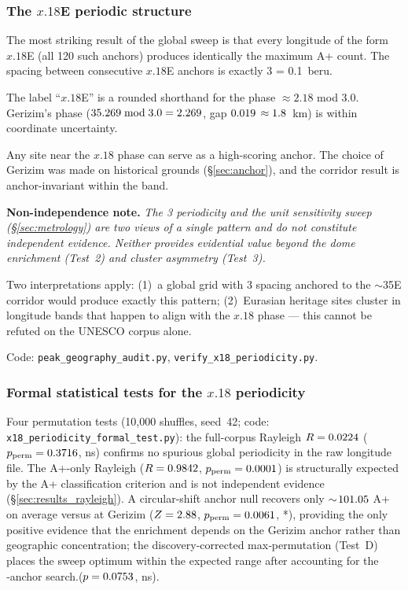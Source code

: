 \documentclass[HARVARD,twocolumn]{USG}
\begin{document}
\subsubsection*{The $x.18$\textdegree{}E periodic structure}
\label{sec:x18artifact}

The most striking result of the global sweep is that every longitude of
the form $x.18$\textdegree{}E (all 120 such anchors) produces identically
the maximum A+ count. The spacing between consecutive $x.18$\textdegree{}E
anchors is exactly 3\textdegree{} = 0.1~beru.

The label ``$x.18$\textdegree{}E'' is a rounded shorthand for the phase
$\approx 2.18$\textdegree{} mod 3.0\textdegree{}.
Gerizim's phase ($35.269 \bmod 3.0 = 2.269$\textdegree{},
gap $0.019$\textdegree{} $\approx 1.8$~km) is within
coordinate uncertainty.

Any site near the $x.18$\textdegree{} phase can serve as a high-scoring
anchor. The choice of Gerizim was made on historical grounds
(\S\ref{sec:anchor}), and the corridor result is anchor-invariant
within the band.

\textbf{Non-independence note.} \emph{The 3\textdegree{} periodicity and the unit
sensitivity sweep (\S\ref{sec:metrology}) are two views of a single
pattern and do not constitute independent evidence. Neither provides
evidential value beyond the dome enrichment (Test~2) and cluster asymmetry (Test~3).}

Two interpretations apply: (1)~a global grid with 3\textdegree{} spacing
anchored to the $\sim$35\textdegree{}E corridor would produce exactly this
pattern; (2)~Eurasian heritage sites cluster in longitude bands that happen
to align with the $x.18$\textdegree{} phase — this cannot be refuted on the
UNESCO corpus alone.

Code: \texttt{peak\_geography\_audit.py}, \texttt{verify\_x18\_periodicity.py}.

\subsubsection*{Formal statistical tests for the $x.18$\textdegree{} periodicity}
\label{sec:x18_formal}

Four permutation tests (10,000 shuffles, seed~42;
code: \texttt{x18\_periodicity\_formal\_test.py}):
the full-corpus Rayleigh $R = 0.0224$ ($p_\mathrm{perm} = 0.3716$, ns)
confirms no spurious global periodicity in the raw longitude file.
The A+-only Rayleigh ($R = 0.9842$, $p_\mathrm{perm} = 0.0001$)
is structurally expected by the A+ classification criterion and is not
independent evidence (\S\ref{sec:results_rayleigh}).
A circular-shift anchor null recovers only $\sim\!101.05$ A+ on average
versus \anchorShiftApCount{} at Gerizim ($Z = 2.88$,
$p_\mathrm{perm} = 0.0061$, *), providing the only positive evidence that 
the enrichment depends on the Gerizim anchor rather than geographic concentration; 
the discovery-corrected max‑permutation (Test~D) places the sweep 
optimum within the expected range after accounting for 
the \anchorSweepNanchors{}‑anchor search.($p = 0.0753$, ns).
\end{document}
